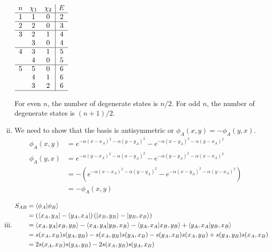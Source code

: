 \documentclass{article}
\begin{document}
\begin{enumerate}[i)]
    \begin{center}
      $\begin{array}{ccc|c}
       n & \chi_1 & \chi_2 & E \\ \hline
       1 &  1 & 0 & 2 \\ \hline
       2 &  2 & 0 & 3 \\ \hline
       3 & 2 & 1 & 4 \\
         & 3 & 0 & 4 \\ \hline
       4 & 3 & 1 & 5 \\
         & 4 & 0 & 5 \\ \hline
       5 & 5 & 0 & 6 \\
         & 4 & 1 & 6 \\
         & 3 & 2 & 6 \\ \hline
      \end{array}$
    \end{center}

    For even $n$, the number of degenerate states is $n/2$. For odd $n$, the number of degenerate states is $(n+1)/2$. 

  \item We need to show that the basis is antisymmetric or $\phi_A(x, y) = -\phi_A(y, x)$.
    \begin{align*}
      \phi_A(x,y) &= e^{-\alpha(x-x_A)^2 - \alpha(y-y_A)^2} - e^{-\alpha(x-y_A)^2 - \alpha(y-x_A)^2} \\
      \phi_A(y,x) &= e^{-\alpha(y-x_A)^2 - \alpha(x-y_A)^2} - e^{-\alpha(y-y_A)^2 - \alpha(x-x_A)^2} \\
      &= -(e^{-\alpha(x-x_A)^2 - \alpha(y-y_A)^2} - e^{-\alpha(x-y_A)^2 - \alpha(y-x_A)^2}) \\
      &= -\phi_A(x,y)
    \end{align*}

  \item 
    \begin{align*}
      S_{AB} &= \bra{\phi_A}\ket{\phi_B} \\
      &= \left( \bra{x_A,y_A}-\bra{y_A,x_A}\right)\left( \ket{x_B,y_B} - \ket{y_B,x_B}\right) \\
      &= \bra{x_A,y_A}\ket{x_B,y_B}-\bra{x_A,y_A}\ket{y_B,x_B}-\bra{y_A,x_A}\ket{x_B,y_B}+\bra{y_A,x_A}\ket{y_B,x_B} \\
      &= s(x_A,x_B)s(y_A,y_B) - s(x_A,y_B)s(y_A,x_B) - s(y_A,x_B)s(x_A,y_B) + s(y_A,y_B)s(x_A,x_B) \\
      &= 2s(x_A,x_B)s(y_A,y_B) - 2s(x_A,y_B)s(y_A,x_B)
    \end{align*}


\end{enumerate}
\end{document}
